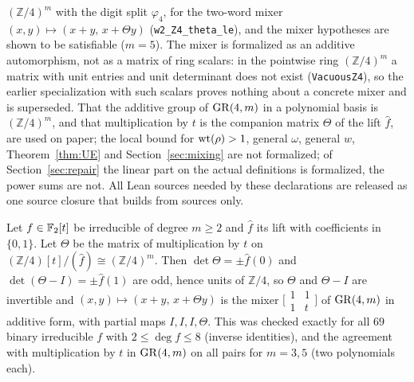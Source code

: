 $(\mathbb Z/4)^m$ with the digit split $\varphi_4$, for the two-word mixer $(x,y)\mapsto(x+y,\,x+\Theta y)$
(\texttt{w2\_Z4\_theta\_le}), and the mixer hypotheses are shown to be satisfiable ($m=5$). The mixer is formalized as an additive
automorphism, not as a matrix of ring scalars: in the pointwise ring $(\mathbb Z/4)^m$ a matrix with unit entries and unit
determinant does not exist (\texttt{VacuousZ4}), so the earlier specialization with such scalars proves nothing about a concrete mixer
and is superseded. That the additive group of $\mathrm{GR}(4,m)$ in a polynomial basis is $(\mathbb Z/4)^m$, and that multiplication by $t$ is
the companion matrix $\Theta$ of the lift $\hat f$, are used on paper; the local bound for $\mathrm{wt}(\rho)>1$, general $\omega$, general $w$,
Theorem~\ref{thm:UE} and Section~\ref{sec:mixing} are not formalized; of Section~\ref{sec:repair} the linear part on the actual
definitions is formalized, the power sums are not. All Lean sources needed by these declarations are released as one source
closure that builds from sources only.

\begin{remark}\label{rem:theta}
Let $f\in\mathbb{F}_2[t]$ be irreducible of degree $m\ge2$ and $\hat f$ its lift with coefficients in $\{0,1\}$. Let $\Theta$ be the matrix of
multiplication by $t$ on $(\mathbb Z/4)[t]/(\hat f)\cong(\mathbb Z/4)^m$. Then $\det\Theta=\pm\hat f(0)$ and $\det(\Theta-I)=\pm\hat f(1)$
are odd, hence units of $\mathbb Z/4$, so $\Theta$ and $\Theta-I$ are invertible and $(x,y)\mapsto(x+y,\,x+\Theta y)$ is the mixer
$\bigl[\begin{smallmatrix}1&1\\1&t\end{smallmatrix}\bigr]$ of $\mathrm{GR}(4,m)$ in additive form, with partial maps $I,I,I,\Theta$.
This was checked exactly for all $69$ binary irreducible $f$ with $2\le\deg f\le8$ (inverse identities), and the agreement with
multiplication by $t$ in $\mathrm{GR}(4,m)$ on all pairs for $m=3,5$ (two polynomials each).
\end{remark}


